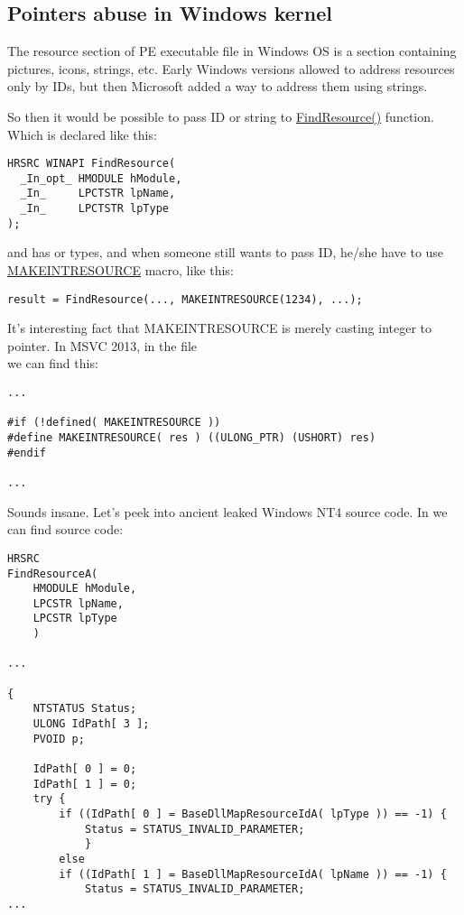 \subsection{Pointers abuse in Windows kernel}

The resource section of PE executable file in Windows OS is a section containing pictures, icons, strings, etc.
Early Windows versions allowed to address resources only by IDs, but then Microsoft added a way to address them using strings.

So then it would be possible to pass ID or string to 
\href{https://msdn.microsoft.com/en-us/library/windows/desktop/ms648042%28v=vs.85%29.aspx}{FindResource()} function.
Which is declared like this:


\begin{lstlisting}[style=customc]
HRSRC WINAPI FindResource(
  _In_opt_ HMODULE hModule,
  _In_     LPCTSTR lpName,
  _In_     LPCTSTR lpType
);
\end{lstlisting}

 and  has  or  types, and when someone still wants to pass ID,
he/she have to use
\href{https://msdn.microsoft.com/en-us/library/windows/desktop/ms648029%28v=vs.85%29.aspx}{MAKEINTRESOURCE} macro, like this:


\begin{lstlisting}[style=customc]
result = FindResource(..., MAKEINTRESOURCE(1234), ...);
\end{lstlisting}

It's interesting fact that MAKEINTRESOURCE is merely casting integer to pointer.
In MSVC 2013, in the file\\
 we can find this:

\begin{lstlisting}[style=customc]
...

#if (!defined( MAKEINTRESOURCE )) 
#define MAKEINTRESOURCE( res ) ((ULONG_PTR) (USHORT) res)
#endif

...
\end{lstlisting}

Sounds insane. Let's peek into ancient leaked Windows NT4 source code.
In  we can find  source code:

\begin{lstlisting}[style=customc]
HRSRC
FindResourceA(
    HMODULE hModule,
    LPCSTR lpName,
    LPCSTR lpType
    )

...

{
    NTSTATUS Status;
    ULONG IdPath[ 3 ];
    PVOID p;

    IdPath[ 0 ] = 0;
    IdPath[ 1 ] = 0;
    try {
        if ((IdPath[ 0 ] = BaseDllMapResourceIdA( lpType )) == -1) {
            Status = STATUS_INVALID_PARAMETER;
            }
        else
        if ((IdPath[ 1 ] = BaseDllMapResourceIdA( lpName )) == -1) {
            Status = STATUS_INVALID_PARAMETER;
...
\end{lstlisting}

